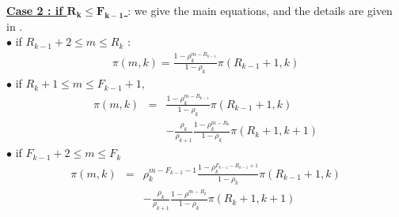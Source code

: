\documentclass[conference]{IEEEtran}
\begin{document}
\noindent
 \underline{{\textbf{Case 2 : if $\mathbf{R_{k} \leq F_{k-1}}$ }}}: we give the main equations, and the details  are given in \cite{le2000simple}.\\
\noindent
$\bullet$ if  $R_{k-1}+2 \leq m \leq R_k$ :  
\begin{eqnarray}
\pi(m,k)=\frac{1-\rho_k^{m-R_{k-1}}}{1-\rho_k} \pi(R_{k-1}+1,k)
\label{eqB1}
\end{eqnarray} 
$\bullet$ if $R_k+1 \leq m \leq F_{k-1}+1$, 
\begin{eqnarray} 
 \pi(m,k)&=&\frac{1-\rho_k^{m-R_{k-1} }} {1-\rho_k} \pi(R_{k-1}+1,k) \nonumber\\
&&-\frac{\rho_k}{\rho_{k+1}} \frac{1- \rho_k^{m-R_k}}{1-\rho_k} \pi(R_k+1,k+1) 
\label{eqB2}
 \end{eqnarray} 
$\bullet$ if $F_{k-1}+2 \leq m \leq F_k$ 
 \begin{eqnarray} 
 \pi(m,k)&= & \rho_k^{m-F_{k-1}-1} \frac{1-\rho_k^{F_{k-1}-R_{k-1}+1}} {1-\rho_k} \pi(R_{k-1}+1,k) \nonumber \\
 &&- \frac{\rho_k}{\rho_{k+1}}
\frac{1-\rho^{m-R_k}}{1-\rho_k} \pi(R_{k}+1,k+1) 
\label{eqB3}
 \end{eqnarray} 
\end{document}
